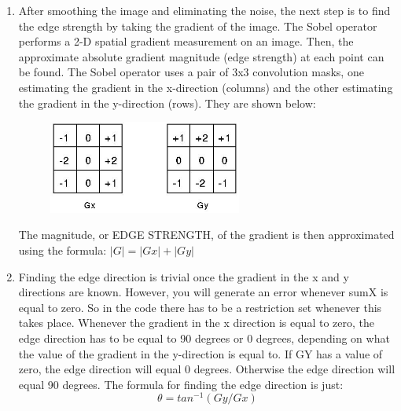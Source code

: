 \begin{enumerate}
\item After smoothing the image and eliminating the noise, the next step is to find the edge strength by taking the gradient of the image. The Sobel operator performs a 2-D spatial gradient measurement on an image. Then, the approximate absolute gradient magnitude (edge strength) at each point can be found. The Sobel operator uses a pair of 3x3 convolution masks, one estimating the gradient in the x-direction (columns) and the other estimating the gradient in the y-direction (rows). They are shown below:
\begin{figure}[H]
\centering
\label{fig:Mask} 
\includegraphics[width=0.6\textwidth]{Mask}
\end{figure}
The magnitude, or EDGE STRENGTH, of the gradient is then approximated using the formula: $|G| = |Gx| + |Gy|$
\item Finding the edge direction is trivial once the gradient in the x and y directions are known. However, you will generate an error whenever sumX is equal to zero. So in the code there has to be a restriction set whenever this takes place. Whenever the gradient in the x direction is equal to zero, the edge direction has to be equal to 90 degrees or 0 degrees, depending on what the value of the gradient in the y-direction is equal to. If GY has a value of zero, the edge direction will equal 0 degrees. Otherwise the edge direction will equal 90 degrees. The formula for finding the edge direction is just: $$\theta = tan^{-1} (Gy / Gx)$$


\end{enumerate}
